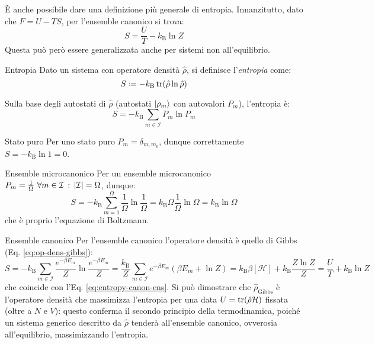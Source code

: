 È anche possibile dare una definizione più generale di entropia. Innanzitutto, dato che $ F = U - TS $, per l'ensemble canonico si trova:
\begin{equation}
	S = \frac{U}{T} - k_\text{B} \ln Z
	\label{eq:entropy-canon-ens}
\end{equation}
Questa può però essere generalizzata anche per sistemi non all'equilibrio.

\begin{definition}{Entropia}{}
	Dato un sistema con operatore densità $ \hat{\rho} $, si definisce l'\textit{entropia} come:
	\begin{equation}
		S \defeq - k_\text{B} \tr(\hat{\rho} \ln \hat{\rho})
	\end{equation}
\end{definition}

Sulla base degli autostati di $ \hat{\rho} $ (autostati $ \ket{\rho_m} $ con autovalori $ P_m $), l'entropia è:
\begin{equation}
	S = - k_\text{B} \sum_{m \in \mathcal{I}} P_m \ln P_m
\end{equation}

\begin{example}{Stato puro}{}
	Per uno stato puro $ P_m = \delta_{m,m_0} $, dunque correttamente $ S = -k_\text{B} \ln 1 = 0 $.
\end{example}

\begin{example}{Ensemble microcanonico}{}
	Per un ensemble microcanonico $ P_m = \frac{1}{\Omega} \,\,\forall m \in \mathcal{I} \,:\, \left\lvert\mathcal{I}\right\rvert = \Omega $, dunque:
	\begin{equation*}
		S = - k_\text{B} \sum_{m = 1}^\Omega \frac{1}{\Omega} \ln \frac{1}{\Omega} = k_\text{B} \Omega \frac{1}{\Omega} \ln \Omega = k_\text{B} \ln \Omega
	\end{equation*}
	che è proprio l'equazione di Boltzmann.
\end{example}

\begin{example}{Ensemble canonico}{}
	Per l'ensemble canonico l'operatore densità è quello di Gibbs (Eq. \ref{eq:op-dens-gibbs}):
	\begin{equation*}
		S = - k_\text{B} \sum_{m \in \mathcal{I}} \frac{e^{-\beta E_m}}{Z} \ln \frac{e^{-\beta E_m}}{Z} = \frac{k_\text{B}}{Z} \sum_{m \in \mathcal{I}} e^{-\beta E_m} (\beta E_m + \ln Z) = k_\text{B} \beta [\mathcal{H}] + k_\text{B} \frac{Z \ln Z}{Z} = \frac{U}{T} + k_\text{B} \ln Z
	\end{equation*}
	che coincide con l'Eq. \ref{eq:entropy-canon-ens}. Si può dimostrare che $ \hat{\rho}_\text{Gibbs} $ è l'operatore densità che massimizza l'entropia per una data $ U = \operatorname{tr}(\hat{\rho}\mathcal{H}) $ fissata (oltre a $ N $ e $ V $): questo conferma il secondo principio della termodinamica, poiché un sistema generico descritto da $ \hat{\rho} $ tenderà all'ensemble canonico, ovverosia all'equilibrio, massimizzando l'entropia.
\end{example}

